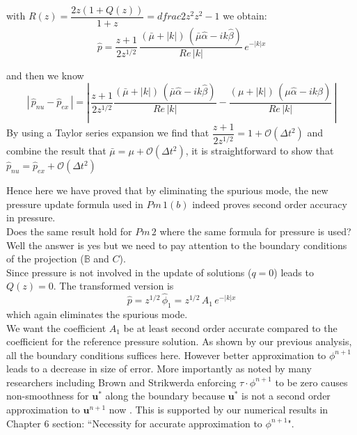 with $R(z) = \dfrac{2z(1+Q(z))}{1+z} = dfrac{2z^2}{z^2 - 1}$ we obtain:\\

\begin{equation}
\hat{p} = \dfrac{z+1}{2z^{1/2}}\,\dfrac{(\bar{\mu} + |k|)\,(\bar{\mu} \hat{\alpha}  -ik \hat{\beta})}{Re\,|k|}\,e^{-|k|x}
\end{equation}

and then we know
\begin{equation*}
|\,\hat{p}_{nu} - \hat{p}_{ex}\,| =|\, \dfrac{z+1}{2 z^{1/2}} \dfrac{(\bar{\mu} + |k|)\,(\bar{\mu} \hat{\alpha}  -ik \hat{\beta})}{Re\,|k|} - \dfrac{(\mu + |k|)\,(\mu \hat{\alpha}  -ik \hat{\beta})}{Re\,|k|}\,|
\end{equation*}
By using a Taylor series expansion we find that $\dfrac{z+1}{2z^{1/2}} = 1 + \mathcal{O}(\Delta t^2)$ and combine the result that $\bar{\mu} = \mu + \mathcal{O}(\Delta t^2)$, it is straightforward to show that $\hat{p}_{nu} = \hat{p}_{ex} + \mathcal{O}(\Delta t^2)$

Hence here we have proved that by eliminating the spurious mode, the new pressure update formula used in $Pm\,1(b)$ indeed proves second order accuracy in pressure.\\

Does the same result hold for $Pm\,2$ where the same formula for pressure is used? Well the answer is yes but we need to pay attention to the boundary conditions of the projection ($\mathbb{B}$ and $C$).\\

Since pressure is not involved in the update of solutions ($q = 0$) leads to $Q(z) = 0$. The transformed version is
\begin{equation}
\hat{p} = z^{1/2}\,\hat{\phi}_1 = z^{1/2}\,A_1\,e^{-|k|x}
\end{equation}
which again eliminates the spurious mode.\\

We want the coefficient $A_1$ be at least second order accurate compared to the coefficient for the reference pressure solution. As shown by our previous analysis, all the boundary conditions suffices here. However better approximation to $\phi^{n+1}$ leads to a decrease in size of error. More importantly as noted by many researchers including Brown and Strikwerda enforcing $\textbf{$\tau$}\cdot\phi^{n+1}$ to be zero causes non-smoothness for $\textbf{u}^*$ along the boundary because $\textbf{u}^*$ is not a second order approximation to $\textbf{u}^{n+1}$ now \cite{strikwerda1999accuracy}. This is supported by our numerical results in Chapter 6 section: ``Necessity for accurate approximation to $\phi^{n+1}$".\\

